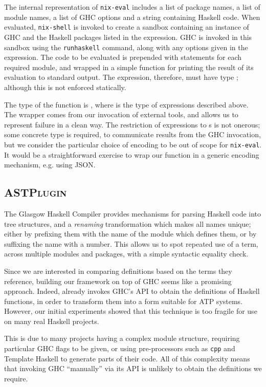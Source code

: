 The internal representation of \texttt{nix-eval} includes a list of package names, a list of module names, a list of GHC options and a string containing Haskell code. When evaluated, \texttt{nix-shell} is invoked to create a sandbox containing an instance of GHC and the Haskell packages listed in the expression. GHC is invoked in this sandbox using the \texttt{runhaskell} command, along with any options given in the expression. The code to be evaluated is prepended with  statements for each required module, and wrapped in a simple  function for printing the result of its evaluation to standard output. The expression, therefore, must have type ; although this is not enforced statically.

The type of the  function is , where  is the type of expressions described above. The  wrapper comes from our invocation of external tools, and  allows us to represent failure in a clean way. The restriction of expressions to s is not onerous; some concrete type is required, to communicate results from the GHC invocation, but we consider the particular choice of encoding to be out of scope for \texttt{nix-eval}. It would be a straightforward exercise to wrap our  function in a generic encoding mechanism, e.g. using JSON.

\subsection{\textsc{ASTPlugin}}
\label{sec:astplugin}

The Glasgow Haskell Compiler provides mechanisms for parsing Haskell code into tree structures, and a \emph{renaming} transformation which makes all names unique; either by prefixing them with the name of the module which defines them, or by suffixing the name with a number. This allows us to spot repeated use of a term, across multiple modules and packages, with a simple syntactic equality check.

Since we are interested in comparing definitions based on the terms they reference, building our framework on top of GHC seems like a promising approach. Indeed, \hspec{} already invokes GHC's API to obtain the definitions of Haskell functions, in order to transform them into a form suitable for ATP systems. However, our initial experiments showed that this technique is too fragile for use on many real Haskell projects.

This is due to many projects having a complex module structure, requiring particular GHC flags to be given, or using pre-processors such as \texttt{cpp} and Template Haskell to generate parts of their code. All of this complexity means that invoking GHC ``manually'' via its API is unlikely to obtain the definitions we require.

